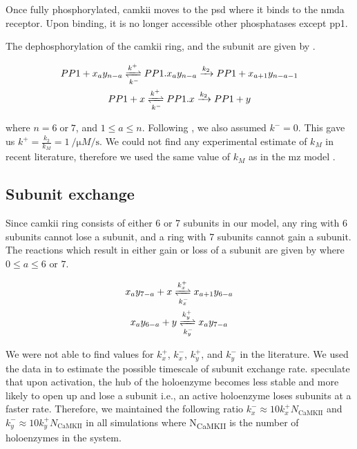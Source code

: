 \documentclass[9pt,lineno,doublespacing]{elife}
\newcommand\SUB[2]{#1\textsubscript{#2}}
\begin{document}
{Once fully phosphorylated, \gls{camkii} moves to the \gls{psd} where it binds to
the \gls{nmda} receptor. Upon binding, it is no longer accessible other 
phosphatases except \gls{pp1}.

The dephosphorylation of the \gls{camkii} ring, and the subunit are given by
.

\begin{equation}\label{eq:dephosphorylation} 
    \begin{gathered} 
        PP1 + x_ay_{n-a} \xrightleftharpoons[k^-]{k^+} PP1.x_ay_{n-a} 
            \xrightarrow{k_2} PP1 + x_{a+1}y_{n-a-1} \\ 
        PP1 + x \xrightleftharpoons[k^-]{k^+} PP1.x \xrightarrow{k_2} PP1 + y 
    \end{gathered}
\end{equation}

\noindent where $n=6\;\text{or}\;7$, and $1\le a \le n$. Following
\cite{miller_stability_2005}, we also assumed $k^-=0$. This gave us
$k^+=\frac{k_2}{k_M}=\SI{1}{\per\micro M\per\second}$. We could not find any
experimental estimate of $k_M$ in recent literature, therefore we used the same
value of $k_M$ as in the \gls{mz} model \citep{miller_stability_2005}.

\subsection{Subunit exchange}\label{subunit exchange} 

Since \gls{camkii} ring consists of either 6 or 7 subunits in our model,
any ring with 6 subunits cannot lose a subunit, and a ring with 7 subunits
cannot gain a subunit. The reactions which result in either gain or loss of a
subunit are given by  where $0\le a \le 6\text{ or }7$.

\begin{equation}\label{eq:losegainx}
    \begin{gathered}
    x_ay_{7-a} + x \xrightleftharpoons[k^-_x]{k^+_x} x_{a+1}y_{6-a} \\
    x_ay_{6-a} + y \xrightleftharpoons[k^-_y]{k^+_y} x_{a}y_{7-a}
    \end{gathered}
\end{equation}

We were not able to find values for $k_x^+$, $k_x^-$, $k_y^+$, and $k_y^-$ in 
the literature. We used the data in
\cite{stratton_activation-triggered_2014} to estimate the possible timescale of
subunit exchange rate. \cite{bhattacharyya_molecular_2016} speculate that upon
activation, the hub of the holoenzyme becomes less stable and more likely to 
open up
and lose a subunit i.e., an active holoenzyme loses subunits at a faster rate. 
Therefore, we
maintained the following ratio \(k_x^- \approx 10 k_x^+ N_{\text{CaMKII}}\) and
\(k_y^- \approx 10 k_y^+ N_{\text{CaMKII}}\) in all simulations where
\SUB{N}{CaMKII} is the number of holoenzymes in the system.

}
\end{document}
